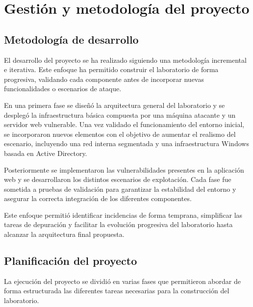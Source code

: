\vspace*{-0.75cm}


\section{Gestión y metodología del proyecto} %
\label{sec:gestion_y_metodologia_del_proyecto}
\vspace{1cm}


\subsection{Metodología de desarrollo}

El desarrollo del proyecto se ha realizado siguiendo una metodología incremental e iterativa. Este enfoque ha permitido construir el laboratorio de forma progresiva, validando cada componente antes de incorporar nuevas funcionalidades o escenarios de ataque.

En una primera fase se diseñó la arquitectura general del laboratorio y se desplegó la infraestructura básica compuesta por una máquina atacante y un servidor web vulnerable. Una vez validado el funcionamiento del entorno inicial, se incorporaron nuevos elementos con el objetivo de aumentar el realismo del escenario, incluyendo una red interna segmentada y una infraestructura Windows basada en Active Directory.

Posteriormente se implementaron las vulnerabilidades presentes en la aplicación web y se desarrollaron los distintos escenarios de explotación. Cada fase fue sometida a pruebas de validación para garantizar la estabilidad del entorno y asegurar la correcta integración de los diferentes componentes.

Este enfoque permitió identificar incidencias de forma temprana, simplificar las tareas de depuración y facilitar la evolución progresiva del laboratorio hasta alcanzar la arquitectura final propuesta.

\subsection{Planificación del proyecto}

La ejecución del proyecto se dividió en varias fases que permitieron abordar de forma estructurada las diferentes tareas necesarias para la construcción del laboratorio.

